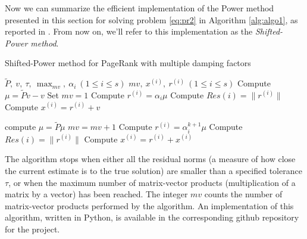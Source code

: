 \noindent Now we can summarize the efficient implementation of the Power method presented in this section for solving problem \ref{eq:pr2} in Algorithm \ref{alg:algo1}, as reported in \cite{SHEN2022126799}. From now on, we'll refer to this implementation as the \emph{Shifted-Power method}.
\clearpage
\begin{algorithm}\label{alg:algo1}
    \caption{Shifted-Power method for PageRank with multiple damping factors}\label{alg:algo1}
    \begin{algorithmic}
        \Require $\tilde P, ~v, ~\tau, ~\max_{mv}, ~\alpha_i ~ (1 \leq i \leq s)$
        \Ensure $mv,~ x^{(i)},~ r^{(i)} ~ (1 \leq i \leq s)$
        \State Compute $\mu = \tilde P v - v$
        \State Set $mv =1$
            \State Compute $r^{(i)} = \alpha_i \mu$
            \State Compute $Res(i) = \lVert r^{(i)} \rVert$
                \State Compute $x^{(i)} = r^{(i)} + v$
            \EndIf
        \EndFor

            \State compute $\mu = \tilde P \mu$
            \State $mv = mv + 1$
                    \State Compute $r^{(i)} = \alpha_i^{k+1} \mu$
                    \State Compute $Res(i) = \lVert r^{(i)} \rVert$
                        \State Compute $x^{(i)} = r^{(i)} + x^{(i)}$
                    \EndIf
                \EndIf
            \EndFor
        \EndWhile
    \end{algorithmic}
\end{algorithm}


\noindent The algorithm stops when either all the residual norms (a measure of how close the current estimate is to the true solution) are smaller than a specified tolerance $\tau$, or when the maximum number of matrix-vector products (multiplication of a matrix by a vector) has been reached. The integer $mv$ counts the number of matrix-vector products performed by the algorithm. An implementation of this algorithm, written in Python, is available in the corresponding github repository for the project.

\clearpage

